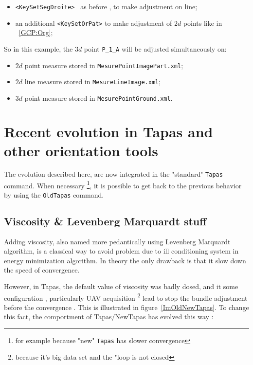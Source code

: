\begin{itemize}
   \item  {\tt <KeySetSegDroite> } as before , to make adjustment on line;
   \item an additional {\tt  <KeySetOrPat>} to make adjustment of $2d$ points like in  ~\ref{GCP:Org};

\end{itemize}

So in this example, the $3d$ point {\tt P\_1\_A} will be adjusted simultaneously on:

\begin{itemize}
    \item $2d$ point measure stored in {\tt MesurePointImagePart.xml};
    \item $2d$ line measure stored in {\tt MesureLineImage.xml};
    \item $3d$ point measure stored in {\tt MesurePointGround.xml}.
\end{itemize}

\section{Recent evolution in Tapas and other orientation tools}

The evolution described here, are now integrated in the "standard" {\tt Tapas} command.
When necessary \footnote{for example because "new"  {\tt Tapas} has slower convergence}, it is possible
to get back to the previous behavior by using the {\tt OldTapas} command.




\subsection{Viscosity \& Levenberg Marquardt stuff}

Adding viscosity, also named more pedantically using Levenberg Marquardt algorithm,
is a classical way to avoid problem due to ill conditioning system in energy minimization algorithm.
In theory the only drawback is that it slow down the speed of convergence.

However, in Tapas, the default value of viscosity was badly dosed, and it  some configuration ,
particularly UAV acquisition \footnote{because it's big data set and the "loop is not closed}
lead to stop the bundle adjustment before the convergence . This is illustrated in figure~\ref{ImOldNewTapas}.
 To change this fact, the comportment of Tapas/NewTapas has evolved this way :

